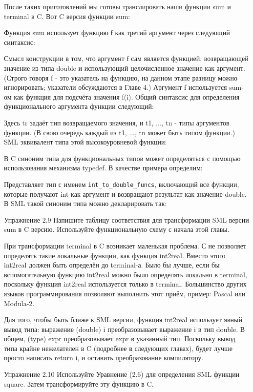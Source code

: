 После таких приготовлений мы готовы транслировать наши функции sum и terminal в C. Вот C версия функции sum:

Функция sum использует функцию f как третий аргумент через следующий синтаксис:

Смысл конструкции в том, что аргумент f сам является функцией, возвращающей значение из типа double и использующий целочисленное значение как аргумент. (Строго говоря f - это указатель на функцию, на данном этапе разницу можно игнорировать; указатели обсуждаются в Главе 4.) Аргумент f используется sum-ом как функция для подсчёта значения f(i). Общий синтаксис для определения функционального аргумента функции следующий:

Здесь tr задаёт тип возвращаемого значения, и t1, ..., tn - типы аргументов функции. (В свою очередь каждый из t1, ..., tn может быть типом функции.) SML эквивалент типа этой высокоуровневой функции:

В C синоним типа для функциональных типов может определяться с помощью использования механизма typedef. В качестве примера определим:

Представляет тип с именем \lstinline|int_to_double_funcs|, включающий все функции, которые получают int как аргумент и возвращают результат как значение double. В SML такой синоним типа можно декларировать так:

Упражнение 2.9 Напишите таблицу соответствия для трансформации SML версии sum в C версию. Используйте функциональную схему с начала этой главы.

При трансформации terminal в C возникает маленькая проблема. С не позволяет определять такие локальные функции, как функция int2real. Вместо этого int2real должен быть определён до terminal-а. Было бы лучше, если бы вспомогательную функцию int2real можно было определять локально в terminal, поскольку функция int2real используется только в terminal. Большинство других языков программирования позволяют выполнить этот приём, пример: Pascal или Modula-2.

Для того, чтобы быть ближе к SML версии, функция int2real использует явный вывод типа: выражение (double) i преобразовывает выражение i в тип double. В общем, (type) expr преобразовывает expr в указанный тип. Поскольку вывод типа крайне нежелателен в C (подробнее в следующих главах), будет лучше просто написать return i, и оставить преобразование компилятору.

Упражнение 2.10 Используйте Уравнение (2.6) для определения SML функции square. Затем трансформируйте эту функцию в C.

